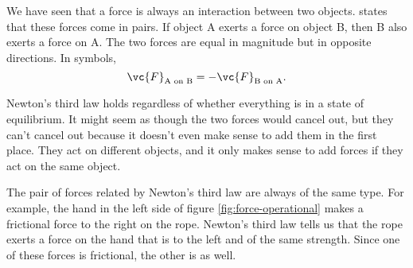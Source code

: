 We have seen that a force is always an interaction between two objects.
states that these forces come in pairs. If object A exerts a
force on object B, then B also exerts a force on A.
The two forces are equal in magnitude but in opposite directions.
In symbols,
\begin{equation}
  \vc{F}_\text{A on B} = -  \vc{F}_\text{B on A}.
\end{equation}

Newton's third law holds regardless of whether everything is
in a state of equilibrium. It might seem as though the two forces
would cancel out, but they can't cancel out because it doesn't
even make sense to add them in the first place. They act on different
objects, and it only makes sense to add forces if they act on the
same object.


The pair of forces related by Newton's third law are always of the
same type. For example, 
the hand in the left side of figure \ref{fig:force-operational}
makes a frictional force to the right on the rope. Newton's third law
tells us that the rope exerts a force on the hand that is to the
left and of the same strength. Since one of these forces is frictional,
the other is as well.
